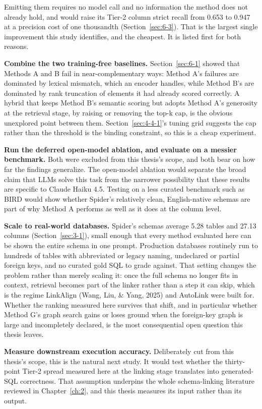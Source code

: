 Emitting them requires no model call and no information the method does not already hold, and would raise its Tier-2 column strict recall from 0.653 to 0.947 at a precision cost of one thousandth (Section~\ref{sec:6-3}). That is the largest single improvement this study identifies, and the cheapest. It is listed first for both reasons.

\textbf{Combine the two training-free baselines.} Section~\ref{sec:6-1} showed that Methods A and B fail in near-complementary ways: Method A's failures are dominated by lexical mismatch, which an encoder handles, while Method B's are dominated by rank truncation of elements it had already scored correctly. A hybrid that keeps Method B's semantic scoring but adopts Method A's generosity at the retrieval stage, by raising or removing the top-k cap, is the obvious unexplored point between them. Section~\ref{sec:4-4-1}'s tuning grid suggests the cap rather than the threshold is the binding constraint, so this is a cheap experiment.

\textbf{Run the deferred open-model ablation, and evaluate on a messier benchmark.} Both were excluded from this thesis's scope, and both bear on how far the findings generalize. The open-model ablation would separate the broad claim that LLMs solve this task from the narrower possibility that these results are specific to Claude Haiku 4.5. Testing on a less curated benchmark such as BIRD would show whether Spider's relatively clean, English-native schemas are part of why Method A performs as well as it does at the column level.

\textbf{Scale to real-world databases.} Spider's schemas average 5.28 tables and 27.13 columns (Section~\ref{sec:3-1}), small enough that every method evaluated here can be shown the entire schema in one prompt. Production databases routinely run to hundreds of tables with abbreviated or legacy naming, undeclared or partial foreign keys, and no curated gold SQL to grade against. That setting changes the problem rather than merely scaling it: once the full schema no longer fits in context, retrieval becomes part of the linker rather than a step it can skip, which is the regime LinkAlign (Wang, Liu, \& Yang, 2025) and AutoLink \citep{wang2025b} were built for. Whether the ranking measured here survives that shift, and in particular whether Method G's graph search gains or loses ground when the foreign-key graph is large and incompletely declared, is the most consequential open question this thesis leaves.

\textbf{Measure downstream execution accuracy.} Deliberately cut from this thesis's scope, this is the natural next study. It would test whether the thirty-point Tier-2 spread measured here at the linking stage translates into generated-SQL correctness. That assumption underpins the whole schema-linking literature reviewed in Chapter~\ref{ch:2}, and this thesis measures its input rather than its output.

